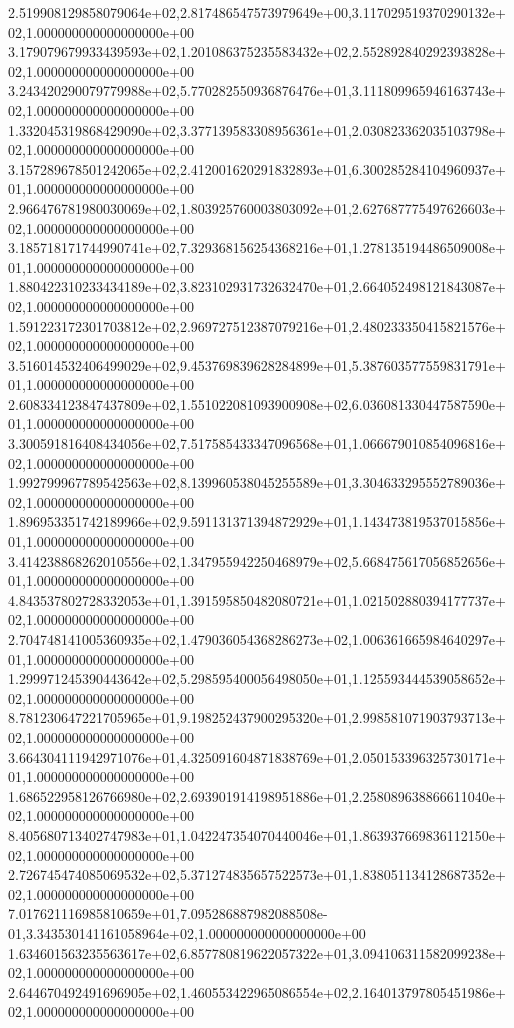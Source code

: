2.519908129858079064e+02,2.817486547573979649e+00,3.117029519370290132e+02,1.000000000000000000e+00
3.179079679933439593e+02,1.201086375235583432e+02,2.552892840292393828e+02,1.000000000000000000e+00
3.243420290079779988e+02,5.770282550936876476e+01,3.111809965946163743e+02,1.000000000000000000e+00
1.332045319868429090e+02,3.377139583308956361e+01,2.030823362035103798e+02,1.000000000000000000e+00
3.157289678501242065e+02,2.412001620291832893e+01,6.300285284104960937e+01,1.000000000000000000e+00
2.966476781980030069e+02,1.803925760003803092e+01,2.627687775497626603e+02,1.000000000000000000e+00
3.185718171744990741e+02,7.329368156254368216e+01,1.278135194486509008e+01,1.000000000000000000e+00
1.880422310233434189e+02,3.823102931732632470e+01,2.664052498121843087e+02,1.000000000000000000e+00
1.591223172301703812e+02,2.969727512387079216e+01,2.480233350415821576e+02,1.000000000000000000e+00
3.516014532406499029e+02,9.453769839628284899e+01,5.387603577559831791e+01,1.000000000000000000e+00
2.608334123847437809e+02,1.551022081093900908e+02,6.036081330447587590e+01,1.000000000000000000e+00
3.300591816408434056e+02,7.517585433347096568e+01,1.066679010854096816e+02,1.000000000000000000e+00
1.992799967789542563e+02,8.139960538045255589e+01,3.304633295552789036e+02,1.000000000000000000e+00
1.896953351742189966e+02,9.591131371394872929e+01,1.143473819537015856e+01,1.000000000000000000e+00
3.414238868262010556e+02,1.347955942250468979e+02,5.668475617056852656e+01,1.000000000000000000e+00
4.843537802728332053e+01,1.391595850482080721e+01,1.021502880394177737e+02,1.000000000000000000e+00
2.704748141005360935e+02,1.479036054368286273e+02,1.006361665984640297e+01,1.000000000000000000e+00
1.299971245390443642e+02,5.298595400056498050e+01,1.125593444539058652e+02,1.000000000000000000e+00
8.781230647221705965e+01,9.198252437900295320e+01,2.998581071903793713e+02,1.000000000000000000e+00
3.664304111942971076e+01,4.325091604871838769e+01,2.050153396325730171e+01,1.000000000000000000e+00
1.686522958126766980e+02,2.693901914198951886e+01,2.258089638866611040e+02,1.000000000000000000e+00
8.405680713402747983e+01,1.042247354070440046e+01,1.863937669836112150e+02,1.000000000000000000e+00
2.726745474085069532e+02,5.371274835657522573e+01,1.838051134128687352e+02,1.000000000000000000e+00
7.017621116985810659e+01,7.095286887982088508e-01,3.343530141161058964e+02,1.000000000000000000e+00
1.634601563235563617e+02,6.857780819622057322e+01,3.094106311582099238e+02,1.000000000000000000e+00
2.644670492491696905e+02,1.460553422965086554e+02,2.164013797805451986e+02,1.000000000000000000e+00
